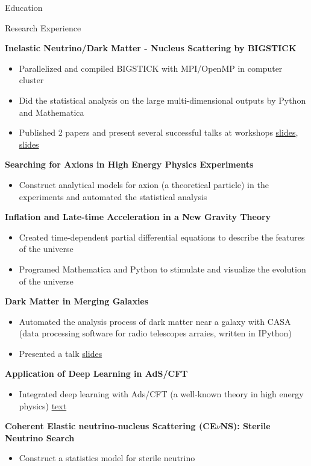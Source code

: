 \documentclass{resume}
\begin{document}
\begin{rSection}{Education}
\begin{rSection}{Research Experience}
\vspace{-1.25em}
\item \textbf{Inelastic Neutrino/Dark Matter - Nucleus Scattering by BIGSTICK}
    \begin{itemize}
    \itemsep -3pt {}
    \item Parallelized and compiled BIGSTICK with MPI/OpenMP in computer cluster
    \item Did the statistical analysis on the large multi-dimensional outputs by Python and Mathematica
    \item Published 2 papers and present several successful talks at workshops \href{https://noctildon.github.io/physics/Phenon_2022.pdf}{slides}, \href{https://noctildon.github.io/physics/Plains_2022.pdf}{slides}
    \end{itemize}
    \item \textbf{Searching for Axions in High Energy Physics Experiments}
    \begin{itemize}
    \itemsep -3pt {}
    \item Construct analytical models for axion (a theoretical particle) in the experiments and automated the statistical analysis
    \end{itemize}
\item \textbf{Inflation and Late-time Acceleration in a New Gravity Theory}
    \begin{itemize}
    \itemsep -3pt {}
    \item Created time-dependent partial differential equations to describe the features of the universe
    \item Programed Mathematica and Python to stimulate and visualize the evolution of the universe
    \end{itemize}
\item \textbf{Dark Matter in Merging Galaxies}
    \begin{itemize}
    \itemsep -3pt {}
    \item Automated the analysis process of dark matter near a galaxy with CASA (data processing software for radio telescopes arraies, written in IPython)
    \item Presented a talk \href{https://noctildon.github.io/physics/dm.pdf}{slides}
    \end{itemize}
\item \textbf{Application of Deep Learning in AdS/CFT}
    \begin{itemize}
    \itemsep -3pt {}
    \item Integrated deep learning with Ads/CFT (a well-known theory in high energy physics) \href{https://noctildon.github.io/physics/DL.pdf}{text}
    \end{itemize}
\item \textbf{Coherent Elastic neutrino-nucleus Scattering (CE$\nu$NS): Sterile Neutrino Search}
    \begin{itemize}
    \itemsep -3pt {}
    \item Construct a statistics model for sterile neutrino
    \end{itemize}
\end{rSection}



\end{rSection}
\end{document}
